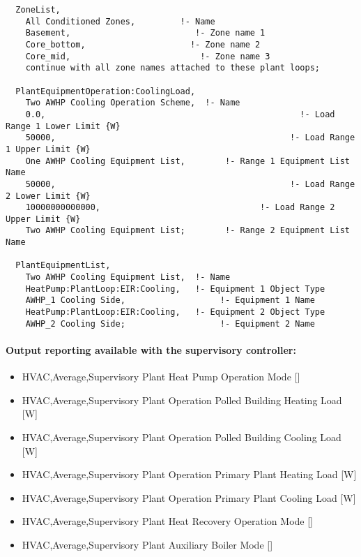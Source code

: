 \begin{lstlisting}
  ZoneList,
    All Conditioned Zones,         !- Name
    Basement,                         !- Zone name 1
    Core_bottom,                     !- Zone name 2
    Core_mid,                          !- Zone name 3
    continue with all zone names attached to these plant loops;

  PlantEquipmentOperation:CoolingLoad,
    Two AWHP Cooling Operation Scheme,  !- Name
    0.0,                                                   !- Load Range 1 Lower Limit {W}
    50000,                                               !- Load Range 1 Upper Limit {W}
    One AWHP Cooling Equipment List,        !- Range 1 Equipment List Name
    50000,                                               !- Load Range 2 Lower Limit {W}
    10000000000000,                                !- Load Range 2 Upper Limit {W}
    Two AWHP Cooling Equipment List;        !- Range 2 Equipment List Name

  PlantEquipmentList,
    Two AWHP Cooling Equipment List,  !- Name
    HeatPump:PlantLoop:EIR:Cooling,   !- Equipment 1 Object Type
    AWHP_1 Cooling Side,                   !- Equipment 1 Name
    HeatPump:PlantLoop:EIR:Cooling,   !- Equipment 2 Object Type
    AWHP_2 Cooling Side;                   !- Equipment 2 Name  
\end{lstlisting}

\paragraph{Output reporting available with the supervisory controller:}\label{operation-scheme-heating-outputs-description}

\begin{itemize}
    \item
    HVAC,Average,Supervisory Plant Heat Pump Operation Mode  {[}{]}
    \item
    HVAC,Average,Supervisory Plant Operation Polled Building Heating Load  {[}W{]}
    \item
    HVAC,Average,Supervisory Plant Operation Polled Building Cooling Load  {[}W{]}
    \item 
    HVAC,Average,Supervisory Plant Operation Primary Plant Heating Load  {[}W{]}
    \item
    HVAC,Average,Supervisory Plant Operation Primary Plant Cooling Load  {[}W{]}
    \item
    HVAC,Average,Supervisory Plant Heat Recovery Operation Mode  {[}{]}
    \item
    HVAC,Average,Supervisory Plant Auxiliary Boiler Mode  {[}{]}
\end{itemize}

